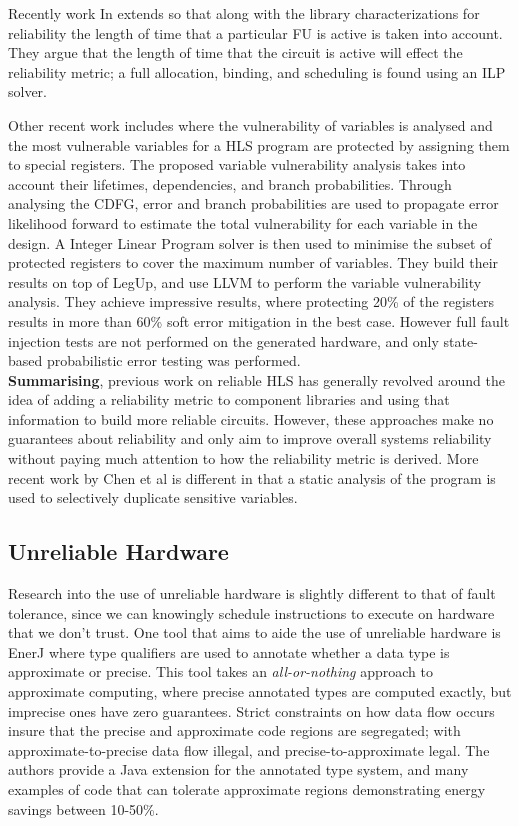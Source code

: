 Recently work In \cite{hara2013cost} extends \cite{tosun2005reliability}
so that along with the library characterizations for reliability the length of time that a particular FU is active is taken into account.
They argue that the length of time that the circuit is active will effect the reliability metric;
a full allocation, binding, and scheduling is found using an ILP solver.

Other recent work includes \cite{chen2014reliability} where the vulnerability of variables is analysed and the most vulnerable
variables for a HLS program are protected by assigning them to special registers.
The proposed variable vulnerability analysis takes into account their lifetimes, dependencies, and branch probabilities.
Through analysing the CDFG, error and branch probabilities are used to propagate error likelihood forward to estimate the total
vulnerability for each variable in the design.
A Integer Linear Program solver is then used to minimise the subset of protected registers to cover the maximum number of variables.
They build their results on top of LegUp, and use LLVM to perform the variable vulnerability analysis.
They achieve impressive results, where protecting 20\% of the registers results in more than 60\% soft error mitigation in the best case.
However full fault injection tests are not performed on the generated hardware, and only state-based probabilistic error testing
was performed.\\

\textbf{Summarising}, previous work on reliable HLS has generally revolved around the idea of adding a
reliability metric to component libraries and using that information to build more reliable circuits.
However, these approaches make no guarantees about reliability and only aim to improve overall
systems reliability without paying much attention to how the reliability metric is derived.
More recent work by Chen et al \cite{chen2014reliability} is different in that a static analysis of
the program is used to selectively duplicate sensitive variables.

\subsection{Unreliable Hardware}
Research into  the use of unreliable hardware is slightly different to that of
fault tolerance, since we can knowingly schedule instructions to execute on
hardware that we don't trust.
One tool that aims to aide the use of unreliable hardware is EnerJ \cite{sampson2011enerj} where type qualifiers are used to annotate
whether a data type is approximate or precise.
This tool takes an \emph{all-or-nothing} approach to approximate computing, where precise annotated types are computed exactly, but
imprecise ones have zero guarantees.
Strict constraints on how data flow occurs insure that the precise and approximate code regions are segregated; with
approximate-to-precise data flow illegal, and precise-to-approximate legal.
The authors provide a Java extension for the annotated type system, and many examples of code that can tolerate
approximate regions demonstrating energy savings between 10-50\%.

